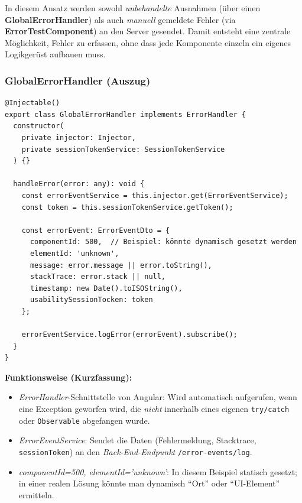 \documentclass[12pt,oneside]{article}
\begin{document}
In diesem Ansatz werden sowohl \emph{unbehandelte} Ausnahmen (über einen \textbf{GlobalErrorHandler}) als auch \emph{manuell} gemeldete Fehler (via \textbf{ErrorTestComponent}) an den Server gesendet. Damit entsteht eine zentrale Möglichkeit, Fehler zu erfassen, ohne dass jede Komponente einzeln ein eigenes Logikgerüst aufbauen muss.

\subsubsection{GlobalErrorHandler (Auszug)}

\begin{lstlisting}
@Injectable()
export class GlobalErrorHandler implements ErrorHandler {
  constructor(
    private injector: Injector,
    private sessionTokenService: SessionTokenService
  ) {}

  handleError(error: any): void {
    const errorEventService = this.injector.get(ErrorEventService);
    const token = this.sessionTokenService.getToken();

    const errorEvent: ErrorEventDto = {
      componentId: 500,  // Beispiel: könnte dynamisch gesetzt werden
      elementId: 'unknown',
      message: error.message || error.toString(),
      stackTrace: error.stack || null,
      timestamp: new Date().toISOString(),
      usabilitySessionTocken: token
    };

    errorEventService.logError(errorEvent).subscribe();
  }
}
\end{lstlisting}

\noindent
\textbf{Funktionsweise (Kurzfassung):}
\begin{itemize}
  \item \emph{ErrorHandler}-Schnittstelle von Angular: Wird automatisch aufgerufen, wenn eine Exception geworfen wird, die \emph{nicht} innerhalb eines eigenen \lstinline|try/catch| oder \lstinline|Observable| abgefangen wurde.
  \item \emph{ErrorEventService}: Sendet die Daten (Fehlermeldung, Stacktrace, \texttt{sessionToken}) an den \emph{Back-End-Endpunkt} \lstinline|/error-events/log|.
  \item \emph{componentId=500, elementId='unknown'}: In diesem Beispiel statisch gesetzt; in einer realen Lösung könnte man dynamisch \enquote{Ort} oder \enquote{UI-Element} ermitteln.
\end{itemize}
\end{document}
